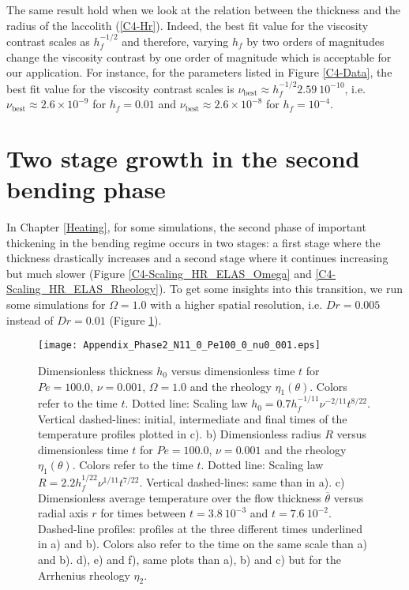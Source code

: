 The  same  result hold  when  we  look  at  the relation  between  the
thickness and the  radius of the laccolith  (\ref{C4-Hr}). Indeed, the
best fit value  for the viscosity contrast scales  as $h_f^{-1/2}$ and
therefore,  varying  $h_f$ by  two  orders  of magnitudes  change  the
viscosity contrast by  one order of magnitude which  is acceptable for
our application.   For instance, for  the parameters listed  in Figure
\ref{C4-Data}, the best fit value for the viscosity contrast scales is
$\nu_{\text{best}}\approx        h_f^{-1/2}2.59~10^{-10}$,        i.e.
$\nu_{\text{best}}\approx  2.6\times   10^{-9}$  for   $h_f=0.01$  and
$\nu_{\text{best}}\approx 2.6\times 10^{-8}$ for $h_f=10^{-4}$.


\section{Two stage growth in the second bending phase}
\label{C4-Heat:AppendixC}

In Chapter  \ref{Heating}, for some  simulations, the second  phase of
important thickening  in the  bending regime occurs  in two  stages: a
first stage  where the  thickness drastically  increases and  a second
stage  where   it  continues   increasing  but  much   slower  (Figure
\ref{C4-Scaling_HR_ELAS_Omega} and \ref{C4-Scaling_HR_ELAS_Rheology}).
To get some insights into this transition, we run some simulations for
$\Omega=1.0$  with  a  higher  spatial  resolution,  i.e.   $Dr=0.005$
instead               of               $Dr=0.01$               (Figure
\ref{C4-Appendix_Phase2_N11_0_Pe100_0_nu0_001}).

\begin{figure}[h!]
  \begin{center}
    \graphicspath{ {/Users/thorey/Documents/These/Projet/Refroidissement/Skin_Model/Figure/Figure_Heating/} }
    \texttt{[image: Appendix\_Phase2\_N11\_0\_Pe100\_0\_nu0\_001.eps]}
    \caption{Dimensionless thickness  $h_0$ versus  dimensionless time
      $t$ for  $Pe=100.0$, $\nu=0.001$, $\Omega=1.0$ and  the rheology
      $\eta_1(\theta)$.  Colors  refer to the time  $t$.  Dotted line:
      Scaling  law $h_0=  0.7h_f^{-1/11}\nu^{-2/11}t^{8/22}$. Vertical
      dashed-lines:  initial,  intermediate  and final  times  of  the
      temperature profiles plotted in c).  b) Dimensionless radius $R$
      versus dimensionless  time $t$  for $Pe=100.0$,  $\nu=0.001$ and
      the rheology  $\eta_1(\theta)$.  Colors  refer to the  time $t$.
      Dotted line:  Scaling law  $R= 2.2h_f^{1/22}\nu^{1/11}t^{7/22}$.
      Vertical dashed-lines: same than in a). c) Dimensionless average
      temperature over  the flow thickness  $\overline{\theta}$ versus
      radial   axis  $r$   for  times   between  $t=3.8~10^{-3}$   and
      $t=7.6~10^{-2}$.   Dashed-line profiles:  profiles at  the three
      different times  underlined in a)  and b). Colors also  refer to
      the time on the same scale than  a) and b).  d), e) and f), same
      plots  than  a),  b)  and  c) but  for  the  Arrhenius  rheology
      $\eta_2$.}
    \label{C4-Appendix_Phase2_N11_0_Pe100_0_nu0_001}
  \end{center}
\end{figure}

